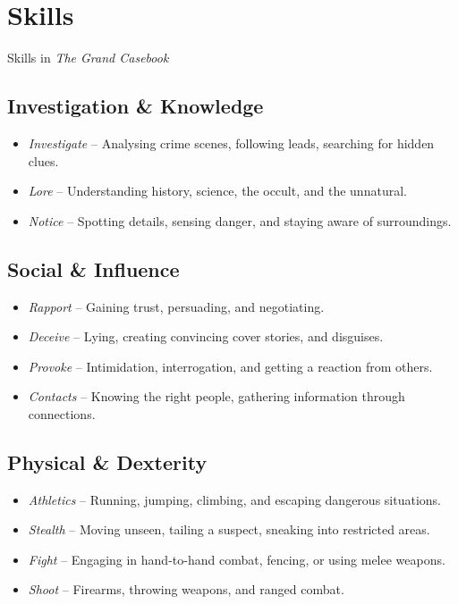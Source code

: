
\section{Skills}
\label{core:skills}

\begin{DndSidebar}[float=!t]{Skills in \emph{The Grand Casebook}}
	\subsection*{Investigation \& Knowledge}  
	\begin{itemize}
    	\item \emph{Investigate} – Analysing crime scenes, following leads, searching for hidden clues.
	    \item \emph{Lore} – Understanding history, science, the occult, and the unnatural.
	    \item \emph{Notice} – Spotting details, sensing danger, and staying aware of surroundings.
	\end{itemize}

	\subsection*{Social \& Influence}  
	\begin{itemize}
    	\item \emph{Rapport} – Gaining trust, persuading, and negotiating.
	    \item \emph{Deceive} – Lying, creating convincing cover stories, and disguises.
    	\item \emph{Provoke} – Intimidation, interrogation, and getting a reaction from others.
	    \item \emph{Contacts} – Knowing the right people, gathering information through connections.
	\end{itemize}

	\subsection*{Physical \& Dexterity}  
	\begin{itemize}
    	\item \emph{Athletics} – Running, jumping, climbing, and escaping dangerous situations.
	    \item \emph{Stealth} – Moving unseen, tailing a suspect, sneaking into restricted areas.
	    \item \emph{Fight} – Engaging in hand-to-hand combat, fencing, or using melee weapons.
	    \item \emph{Shoot} – Firearms, throwing weapons, and ranged combat.
	\end{itemize}


\end{DndSidebar}
